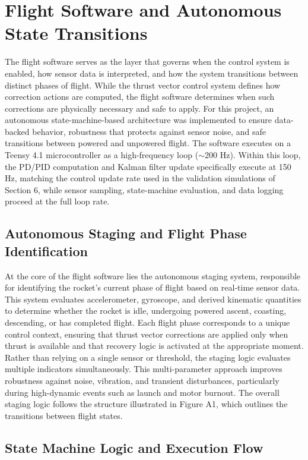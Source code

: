 \section{Flight Software and Autonomous State Transitions}

The flight software serves as the layer that governs when the control system is enabled, how sensor data is interpreted, and how the system transitions between distinct phases of flight. While the thrust vector control system defines how correction actions are computed, the flight software determines when such corrections are physically necessary and safe to apply. For this project, an autonomous state-machine-based architecture was implemented to ensure data-backed behavior, robustness that protects against sensor noise, and safe transitions between powered and unpowered flight. 
The software executes on a Teensy 4.1 microcontroller as a high-frequency loop ($\sim$200 Hz). Within this loop, the PD/PID computation and Kalman filter update specifically execute at 150 Hz, matching the control update rate used in the validation simulations of Section 6, while sensor sampling, state-machine evaluation, and data logging proceed at the full loop rate.


\subsection{Autonomous Staging and Flight Phase Identification}
At the core of the flight software lies the autonomous staging system, responsible for identifying the rocket’s current phase of flight based on real-time sensor data. This system evaluates accelerometer, gyroscope, and derived kinematic quantities to determine whether the rocket is idle, undergoing powered ascent, coasting, descending, or has completed flight. Each flight phase corresponds to a unique control context, ensuring that thrust vector corrections are applied only when thrust is available and that recovery logic is activated at the appropriate moment.
Rather than relying on a single sensor or threshold, the staging logic evaluates multiple indicators simultaneously. This multi-parameter approach improves robustness against noise, vibration, and transient disturbances, particularly during high-dynamic events such as launch and motor burnout. The overall staging logic follows the structure illustrated in Figure A1, which outlines the transitions between flight states.


\subsection{State Machine Logic and Execution Flow}

